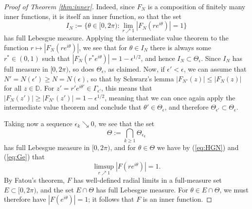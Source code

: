 \documentclass[10pt,a4paper]{amsart}
\begin{document}
\begin{proof}[Proof of Theorem \ref{thm:inner}]
Indeed, since $F_N$ is a composition of finitely many inner functions, it is itself an inner function, so that the set
\[ I_N := \{\theta\in[0, 2\pi) : \lim_{r\nearrow 1} |F_N(re^{i\theta})| = 1\} \]
has full Lebesgue measure. Applying the intermediate value theorem to the function $r\mapsto |F_N(re^{i\theta})|$, we see that for $\theta\in I_N$ there is always some $r^*\in (0, 1)$ such that $|F_N(r^*e^{i\theta})| = 1 - \epsilon^{1/2}$, and hence $I_N\subset \Theta_\epsilon$. Since $I_N$ has full measure in $[0, 2\pi)$, so does $\Theta_\epsilon$, as claimed. Now, if $\epsilon' < \epsilon$, we can assume that $N' = N(\epsilon') \geq N = N(\epsilon)$, so that by Schwarz's lemma $|F_{N'}(z)| \leq |F_N(z)|$ for all $z\in\mathbb{D}$. For $z' = r'e^{i\theta'}\in\Gamma_{\epsilon'}$, this means that $|F_N(z')| \geq |F_{N'}(z')| = 1 - \epsilon^{1/2}$, meaning that we can once again apply the intermediate value theorem and conclude that $\theta'\in \Theta_\epsilon$, and therefore $\Theta_{\epsilon'}\subset \Theta_\epsilon$.

Taking now a sequence $\epsilon_k \searrow 0$, we see that the set
\[ \Theta := \bigcap_{k\geq 1} \Theta_{\epsilon_k} \]
has full Lebesgue measure in $[0, 2\pi)$, and for $\theta\in\Theta$ we have by (\ref{eq:HGN}) and (\ref{eq:Ge}) that
\[ \limsup_{r\nearrow 1} |F(re^{i\theta})| = 1. \]
By Fatou's theorem, $F$ has well-defined radial limits in a full-measure set $E\subset [0, 2\pi)$, and the set $E\cap\Theta$ has full Lebesgue measure. For $\theta\in E\cap\Theta$, we must therefore have $|F(e^{i\theta})| = 1$; it follows that $F$ is an inner function.
\end{proof}
\end{document}
